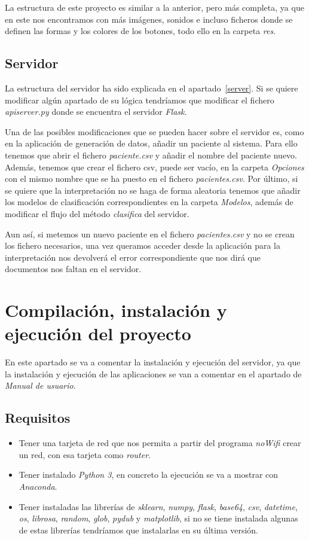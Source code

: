 La estructura de este proyecto es similar a la anterior, pero más completa, ya que en este nos encontramos con más imágenes, sonidos e incluso ficheros donde se definen las formas y los colores de los botones, todo ello en la carpeta \textit{res}.
\subsection{Servidor}
La estructura del servidor ha sido explicada en el apartado~\ref{server}. Si se quiere modificar algún apartado de su lógica tendríamos que modificar el fichero \textit{apiserver.py} donde se encuentra el servidor \textit{Flask}.

Una de las posibles modificaciones que se pueden hacer sobre el servidor es, como en la aplicación de generación de datos, añadir un paciente al sistema. Para ello tenemos que abrir el fichero \textit{paciente.csv} y añadir el nombre del paciente nuevo. Además, tenemos que crear el fichero csv, puede ser vacío, en la carpeta \textit{Opciones} con el mismo nombre que se ha puesto en el fichero \textit{pacientes.csv}. Por último, si se quiere que la interpretación no se haga de forma aleatoria tenemos que añadir los modelos de clasificación correspondientes en la carpeta \textit{Modelos}, además de modificar el flujo del método \textit{clasifica} del servidor.

Aun así, si metemos un nuevo paciente en el fichero \textit{pacientes.csv} y no se crean los fichero necesarios, una vez queramos acceder desde la aplicación para la interpretación nos devolverá el error correspondiente que nos dirá que documentos nos faltan en el servidor.
\section{Compilación, instalación y ejecución del proyecto}
En este apartado se va a comentar la instalación y ejecución del servidor, ya que la instalación y ejecución de las aplicaciones se van a comentar en el apartado de \textit{Manual de usuario}.

\subsection{Requisitos}
\begin{itemize}
	\item Tener una tarjeta de red que nos permita a partir del programa \textit{noWifi} crear un red, con esa tarjeta como \textit{router}.
	\item Tener instalado \textit{Python 3}, en concreto la ejecución se va a mostrar con \textit{Anaconda}.
	\item Tener instaladas las librerías de \textit{sklearn}, \textit{numpy}, \textit{flask}, \textit{base64}, \textit{csv}, \textit{datetime}, \textit{os}, \textit{librosa}, \textit{random}, \textit{glob}, \textit{pydub} y \textit{matplotlib}, si no se tiene instalada algunas de estas librerías tendríamos que instalarlas en su última versión.
\end{itemize}

